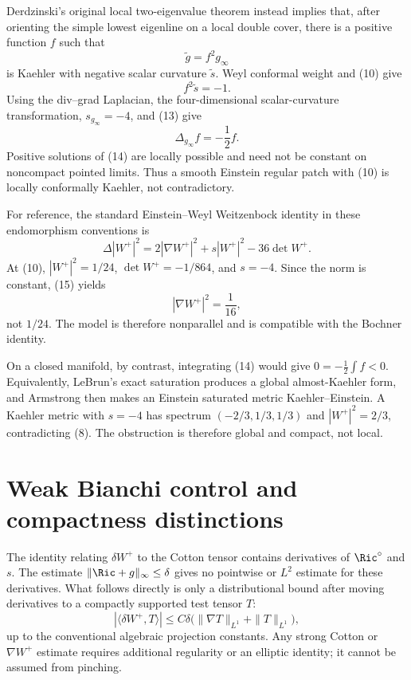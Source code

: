 Derdzinski's original local two-eigenvalue theorem instead implies that,
after orienting the simple lowest eigenline on a local double cover, there
is a positive function $f$ such that
\[
 \widetilde g=f^2g_\infty
\]
is Kaehler with negative scalar curvature $\widetilde s$.  Weyl conformal
weight and (10) give
\[
 f^2\widetilde s=-1.                                         \tag{13}
\]
Using the div--grad Laplacian, the four-dimensional scalar-curvature
transformation, $s_{g_\infty}=-4$, and (13) give
\[
 \Delta_{g_\infty}f=-\frac12f.                               \tag{14}
\]
Positive solutions of (14) are locally possible and need not be constant
on noncompact pointed limits.  Thus a smooth Einstein regular patch with
(10) is locally conformally Kaehler, not contradictory.

For reference, the standard Einstein--Weyl Weitzenbock identity in these
endomorphism conventions is
\[
 \Delta|W^+|^2=2|\nabla W^+|^2+s|W^+|^2-36\det W^+.          \tag{15}
\]
At (10), $|W^+|^2=1/24$, $\det W^+=-1/864$, and $s=-4$.
Since the norm is constant, (15) yields
\[
 |\nabla W^+|^2=\frac1{16},                                  \tag{16}
\]
not $1/24$.  The model is therefore nonparallel and is compatible with the
Bochner identity.

On a closed manifold, by contrast, integrating (14) would give
$0=-\frac12\int f<0$.  Equivalently, LeBrun's exact saturation produces a
global almost-Kaehler form, and Armstrong then makes an Einstein saturated
metric Kaehler--Einstein.  A Kaehler metric with $s=-4$ has spectrum
$(-2/3,1/3,1/3)$ and $|W^+|^2=2/3$, contradicting (8).  The obstruction is
therefore global and compact, not local.

\section{Weak Bianchi control and compactness distinctions}
The identity relating $\delta W^+$ to the Cotton tensor contains derivatives
of $\Ric^\circ$ and $s$.  The estimate $\|\Ric+g\|_\infty\le\delta$ gives no
pointwise or $L^2$ estimate for these derivatives.  What follows directly is
only a distributional bound after moving derivatives to a compactly
supported test tensor $T$:
\[
 |\langle\delta W^+,T\rangle|
 \le C\delta\bigl(\|\nabla T\|_{L^1}+\|T\|_{L^1}\bigr),      \tag{17}
\]
up to the conventional algebraic projection constants.  Any strong Cotton
or $\nabla W^+$ estimate requires additional regularity or an elliptic
identity; it cannot be assumed from pinching.

